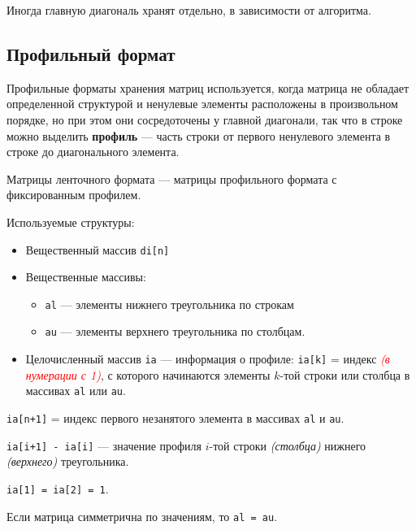 Иногда главную диагональ хранят отдельно, в зависимости от алгоритма.

\pagebreak

\subsection{Профильный формат}

\begin{wrapfigure}{R}{0.5\textwidth}
    \centering
    }
    \caption{Матрица профильного типа. Зеленым --- профиль строки \(i\)}
\end{wrapfigure}
Профильные форматы хранения матриц используется, когда матрица не
обладает определенной структурой и ненулевые элементы расположены в произвольном порядке, но при этом они сосредоточены у главной диагонали, так что в строке можно выделить \textbf{профиль} --- часть строки от первого ненулевого элемента в строке до диагонального элемента.

Матрицы ленточного формата --- матрицы профильного формата с фиксированным профилем.

\pagebreak

Используемые структуры:
\begin{itemize}
    \item Вещественный массив \texttt{di[n]}
    \item Вещественные массивы:
          \begin{itemize}
              \item \texttt{al} --- элементы нижнего треугольника по строкам
              \item \texttt{au} --- элементы верхнего треугольника по столбцам.
          \end{itemize}
    \item Целочисленный массив \texttt{ia} --- информация о профиле: \texttt{ia[k]} = индекс \textcolor{red}{\textit{(в нумерации с 1)}}, с которого начинаются элементы \(k\)-той строки или столбца в массивах \texttt{al} или \texttt{au}.
\end{itemize}

\texttt{ia[n+1]} = индекс первого незанятого элемента в массивах \texttt{al} и \texttt{au}.

\texttt{ia[i+1] - ia[i]} --- значение профиля \(i\)-той строки \textit{(столбца)} нижнего \textit{(верхнего)} треугольника.

\texttt{ia[1] = ia[2] = 1}.

\begin{remark}
    Если матрица симметрична по значениям, то \texttt{al = au}.
\end{remark}

